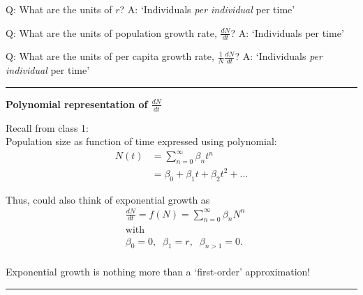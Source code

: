 \documentclass{article}
\newcommand{\note}[1]{\colorbox{gray!20}{#1}}
\begin{document}
\note{Q:}  What are the units of $r$?
\note{A:} `Individuals \emph{per individual} per time'

\note{Q:}  What are the units of population growth rate, $\tfrac{dN}{dt}$?
\note{A:} `Individuals per time'

\note{Q:}  What are the units of per capita growth rate, $\tfrac{1}{N}\tfrac{dN}{dt}$?
\note{A:} `Individuals \emph{per individual} per time'

\rule[0.5ex]{\linewidth}{1pt}

\textbf{Polynomial representation of $\frac{dN}{dt}$}

Recall from class 1:\\
Population size as function of time expressed using polynomial:
\begin{align*}
	N(t)& =\sum_{n=0}^\infty \beta_n t^n\\
	& = \beta_0 + \beta_1 t + \beta_2 t^2 +...
\end{align*}


Thus, could also think of exponential growth as
\begin{align*}
&	\frac{dN}{dt}=f(N)=\sum_{n=0}^\infty \beta_n N^n \\
& 	\text{with }\\
&  \beta_0=0, \;\; \beta_1 = r, \;\; \beta_{n>1}=0.\\
\end{align*}

Exponential growth is nothing more than a `first-order' approximation!

\rule[0.5ex]{\linewidth}{1pt}
\end{document}

